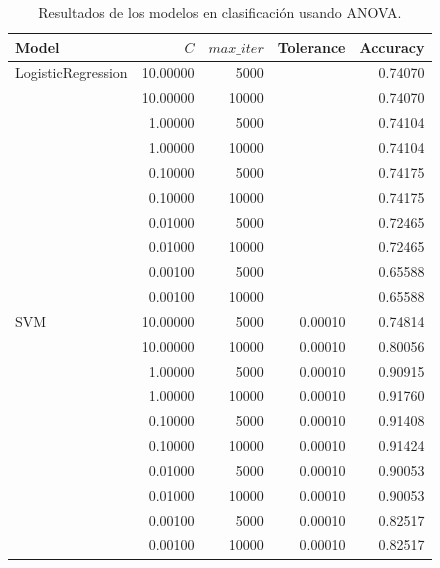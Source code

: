 \documentclass[a4paper, 20pt]{article}
\begin{document}
\begin{table}[H]
  \centering
\begin{tabular}{lrrrr}
Model              & $C$      & $max\_iter$ & Tolerance & Accuracy \\ \hline
LogisticRegression & 10.00000 & 5000        &           & 0.74070  \\
                   & 10.00000 & 10000       &           & 0.74070  \\
                   & 1.00000  & 5000        &           & 0.74104  \\
                   & 1.00000  & 10000       &           & 0.74104  \\
                   & 0.10000  & 5000        &           & 0.74175  \\
                   & 0.10000  & 10000       &           & 0.74175  \\
                   & 0.01000  & 5000        &           & 0.72465  \\
                   & 0.01000  & 10000       &           & 0.72465  \\
                   & 0.00100  & 5000        &           & 0.65588  \\
                   & 0.00100  & 10000       &           & 0.65588  \\
SVM                & 10.00000 & 5000        & 0.00010   & 0.74814  \\
                   & 10.00000 & 10000       & 0.00010   & 0.80056  \\
                   & 1.00000  & 5000        & 0.00010   & 0.90915  \\
                   & 1.00000  & 10000       & 0.00010   & 0.91760  \\
                   & 0.10000  & 5000        & 0.00010   & 0.91408  \\
                   & 0.10000  & 10000       & 0.00010   & 0.91424  \\
                   & 0.01000  & 5000        & 0.00010   & 0.90053  \\
                   & 0.01000  & 10000       & 0.00010   & 0.90053  \\
                   & 0.00100  & 5000        & 0.00010   & 0.82517  \\
                   & 0.00100  & 10000       & 0.00010   & 0.82517 
\end{tabular}
\caption{Resultados de los modelos en clasificación usando ANOVA.}
\end{table}
\end{document}
